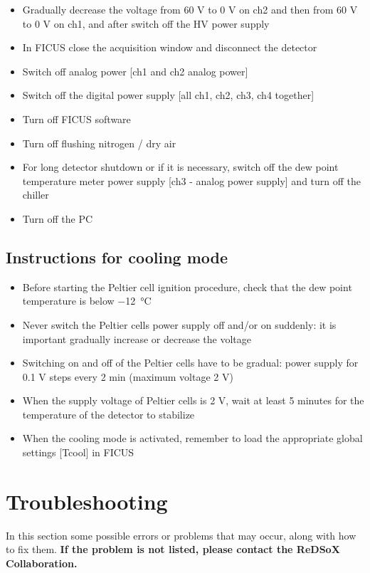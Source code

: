 \documentclass[a4paper,12pt,oneside,pdflatex,italian,final,twocolumn]{article}
\begin{document}
    \begin{itemize}
        \item Gradually decrease the voltage from 60 V to 0 V on ch2 and then from 60 V to 0 V on ch1, and after switch off the HV power supply 
        \item In FICUS close the acquisition window and disconnect the detector
        \item Switch off analog power [ch1 and ch2 analog power]
        \item Switch off the digital power supply [all ch1, ch2, ch3, ch4 together]
        \item Turn off FICUS software
        \item Turn off flushing nitrogen / dry air 
        \item For long detector shutdown or if it is necessary, switch off the dew point temperature meter power supply [ch3 - analog power supply] and turn off the chiller
        \item Turn off the PC
    \end{itemize}
    
    \subsection{Instructions for cooling mode} 
     \begin{itemize}
        \item Before starting the Peltier cell ignition procedure, check that the dew point temperature is below \SI{-12}{\celsius}
        \item Never switch the Peltier cells power supply off and/or on suddenly: it is important gradually increase or decrease the voltage
        \item Switching on and off of the Peltier cells have to be gradual: power supply for 0.1 V steps every 2 min (maximum voltage 2 V)
        \item When the supply voltage of Peltier cells is 2 V, wait at least 5 minutes for the temperature of the detector to stabilize
        \item When the cooling mode is activated, remember to load the appropriate global settings [Tcool] in FICUS
    \end{itemize}   
    
\section{Troubleshooting}
In this section some possible errors or problems that may occur, along with how to fix them. \textbf{If the problem is not listed, please contact the ReDSoX Collaboration.}
\end{document}
